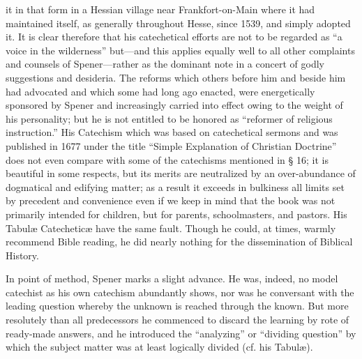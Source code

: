 it in that form in a Hessian village near Frankfort-on-Main where it had maintained itself, as generally throughout Hesse, since 1539, and simply adopted it. It is clear therefore that his catechetical efforts are not to be regarded as “a voice in the wilderness” but—and this applies equally well to all other complaints and counsels of Spener—rather as the dominant note in a concert of godly suggestions and desideria. The reforms which others before him and beside him had advocated and which some had long ago enacted, were energetically sponsored by Spener and increasingly carried into effect owing to the weight of his personality; but he is not entitled to be honored as “reformer of religious instruction.” His Catechism which was based on catechetical sermons and was published in 1677 under the title “Simple Explanation of Christian Doctrine” does not even compare with some of the catechisms mentioned in § 16; it is beautiful in some respects, but its merits are neutralized by an over-abundance of dogmatical and edifying matter; as a result it exceeds in bulkiness all limits set by precedent and convenience even if we keep in mind that the book was not primarily intended for children, but for parents, schoolmasters, and pastors. His Tabulæ Catecheticæ have the same fault. Though he could, at times, warmly recommend Bible reading, he did nearly nothing for the dissemination of Biblical History.

In point of method, Spener marks a slight advance. He was, indeed, no model catechist as his own catechism abundantly shows, nor was he conversant with the leading question whereby the unknown is reached through the known. But more resolutely than all predecessors he commenced to discard the learning by rote of ready-made answers, and he introduced the “analyzing” or “dividing question” by which the subject matter was at least logically divided (cf. his Tabulæ).

